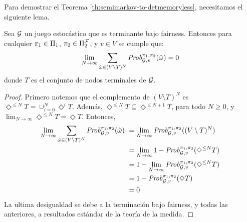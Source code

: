 Para demostrar el Teorema \ref{th:semimarkov-to-detmemoryless},  necesitamos el siguiente lema.



\begin{lemma}\label{lemma:sum-of-nonterminal-is-zero}
  Sea $\mathcal{G}$ un juego estocástico que es terminante bajo fairness.
  Entonces para cualquier $\pi_{1} \in \Pi_{1}$,
  $\pi_{2} \in \Pi^{\mathcal{F}}_{2}$, y $v \in V$ se cumple que:
  \[
  \lim_{N \to \infty} \sum_{\hat{\omega} \in (V \setminus T)^N} \mathit{Prob}^{\pi_{1}, \pi_{2}}_{\mathcal{G},v}(\hat{\omega}) = 0
  \]
  donde $T$ es el conjunto de nodos terminales de $\mathcal{G}$.
\end{lemma}
%
\begin{proof}
  Primero notemos que el complemento de $(V \setminus T)^N$ es
  $\Diamond^{\leq N} T = \cup^N_{i=0} \Diamond^i T$.
  Además, $\Diamond^{\leq N} T \subseteq \Diamond^{\leq N+1} T$, para todo $N\geq 0$,
  y $\lim_{N \to \infty} \Diamond^{\leq N} T = \Diamond T$.
  Entonces,
  \begin{align*}
    \lim_{N \to \infty} \sum_{\hat{\omega} \in (V \setminus T)^N} \mathit{Prob}^{\pi_{1}, \pi_{2}}_{\mathcal{G},v}(\hat{\omega}) \
    & = \lim_{N \to \infty} \mathit{Prob}^{\pi_{1}, \pi_{2}}_{\mathcal{G},v}((V \setminus T)^N) \\
    & = \lim_{N \to \infty} 1 - \mathit{Prob}^{\pi_{1}, \pi_{2}}_{\mathcal{G},v}(\Diamond^{\leq N} T ) \\
    & = 1 - \lim_{N \to \infty} \mathit{Prob}^{\pi_{1}, \pi_{2}}_{\mathcal{G},v}(\Diamond^{\leq N} T ) \\
    & = 1 - \mathit{Prob}^{\pi_{1}, \pi_{2}}_{\mathcal{G},v}(\Diamond T ) \\
    & = 0
  \end{align*}
  La ultima desigualdad se debe a la terminación bajo fairness, y todas las anteriores, a resultados estándar de la teoría de la medida.

\end{proof}
